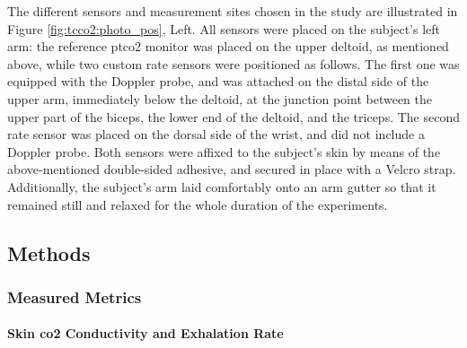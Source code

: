 The different sensors and measurement sites chosen in the study are illustrated in Figure \ref{fig:tcco2:photo_pos}, Left. All sensors were placed on the subject's left arm: the reference \gls{ptco2} monitor was placed on the upper deltoid, as mentioned above, while two custom rate sensors were positioned as follows. The first one was equipped with the Doppler probe, and was attached on the distal side of the upper arm, immediately below the deltoid, at the junction point between the upper part of the biceps, the lower end of the deltoid, and the triceps. The second rate sensor was placed on the dorsal side of the wrist, and did not include a Doppler probe. Both sensors were affixed to the subject's skin by means of the above-mentioned double-sided adhesive, and secured in place with a Velcro strap. Additionally, the subject's arm laid comfortably onto an arm gutter so that it remained still and relaxed for the whole duration of the experiments.

\subsection{Methods}\label{sect:methods}

\subsubsection{Measured Metrics}

\paragraph{Skin \texorpdfstring{\gls{co2}}{CO2} Conductivity and Exhalation Rate}\label{subsect:tcco2:co2_conductivity}\mbox{}\\

